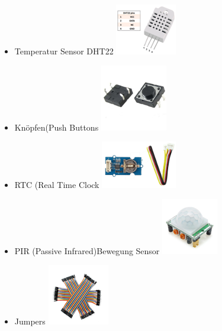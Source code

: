 \documentclass[conference]{IEEEtran}
\begin{document}
\begin{itemize}
	
\item Temperatur Sensor DHT22
	\includegraphics[width=0.27\linewidth]{fig19}
	
\item Knöpfen(Push Buttons	
	\includegraphics[width=0.27\linewidth]{fig20}
	
\item RTC (Real Time Clock
		\includegraphics[width=0.27\linewidth]{fig21}
	
	
\item PIR (Passive Infrared)Bewegung Sensor
	\includegraphics[width=0.27\linewidth]{fig22}
	
\item Jumpers
		\includegraphics[width=0.27\linewidth]{fig23}
\end{itemize}
\end{document}
